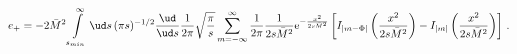 \begin{equation}
e_+
=-2 \bar{M}^{2} \int\limits^\infty_{s_{min}}\ud s\,
(\pi s)^{-1/2}\frac{\ud}{\ud s} \frac{1}{2\pi}\sqrt{\frac{\pi}{s}}
\sum\limits^\infty_{m=-\infty}\frac{1}{2\pi}
\frac{1}{2s\bar{M}^{2} }\text{e}^{-\frac{x^2}{2s\bar{M}^{2} }} \left[
I_{|m-\Phi|}\left(\frac{x^{2} }{2s\bar{M}^{2} }\right)
-I_{|m|}\left(\frac{x^{2} }{2s\bar{M}^{2} }\right)\right]\,.
\end{equation}

